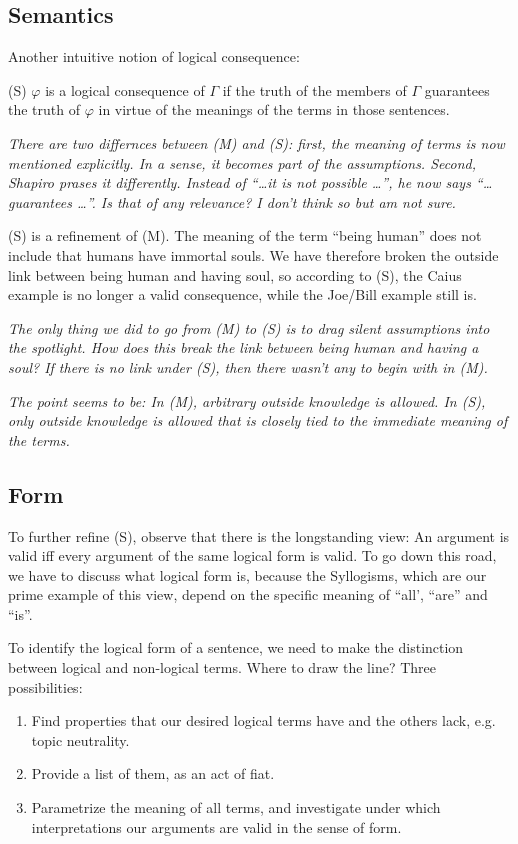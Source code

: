 \documentclass[a4paper]{article}
\begin{document}
\subsection{Semantics}

Another intuitive notion of logical consequence:

(S) $\varphi$ is a logical consequence of $\Gamma$ if the truth of the members
of $\Gamma$ guarantees the truth of $\varphi$ in virtue of the meanings of the
terms in those sentences.

\emph{There are two differnces between (M) and (S): first, the meaning of terms
is now mentioned explicitly.  In a sense, it becomes part of the assumptions.
Second, Shapiro prases it differently. Instead of ``\ldots it is not possible
\ldots'', he now says ``\ldots guarantees \ldots''.  Is that of any relevance? I
don't think so but am not sure.}

(S) is a refinement of (M).  The meaning of the term ``being human'' does not
include that humans have immortal souls.  We have therefore broken the outside
link between being human and having soul, so according to (S), the Caius example
is no longer a valid consequence, while the Joe/Bill example still is.

\emph{The only thing we did to go from (M) to (S) is to drag silent assumptions
into the spotlight.  How does this break the link between being human and having
a soul? If there is no link under (S), then there wasn't any to begin with in
(M).}

\emph{The point seems to be: In (M), arbitrary outside knowledge is allowed. In
(S), only outside knowledge is allowed that is closely tied to the immediate
meaning of the terms.}

\subsection{Form}

To further refine (S), observe that there is the longstanding view:  An argument
is valid iff every argument of the same logical form is valid.  To go down this
road, we have to discuss what logical form is, because the Syllogisms, which are
our prime example of this view, depend on the specific meaning of ``all',
``are'' and ``is''.

To identify the logical form of a sentence, we need to make the distinction
between logical and non-logical terms.  Where to draw the line?  Three
possibilities:
\begin{enumerate}

  \item Find properties that our desired logical terms have and the others lack,
  e.g. topic neutrality.

  \item Provide a list of them, as an act of fiat.

  \item Parametrize the meaning of all terms, and investigate under which
  interpretations our arguments are valid in the sense of form.
\end{enumerate}
\end{document}
